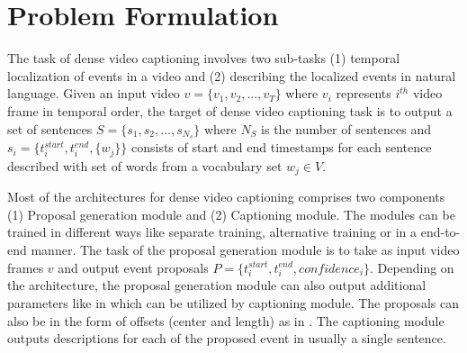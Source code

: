\section{Problem Formulation}
\par The task of dense video captioning involves two sub-tasks (1) temporal localization of events in a video and (2) describing the localized events in natural language. Given an input video $v = \{v_1, v_2, ... , v_T \}$ where $v_i$ represents $i^{th}$ video frame in temporal order, the target of dense video captioning task is to output a set of sentences $S = \{s_1, s_2, ... , s_{N_s}\}$ where $N_S$ is the number of sentences and $s_i = \{t_i^{start}, t_i^{end}, \{w_j\} \}$ consists of start and end timestamps for each sentence described with set of words from a vocabulary set $w_j \in V$.
\par Most of the architectures for dense video captioning comprises two components (1) Proposal generation module and (2) Captioning module. The modules can be trained in different ways like separate training, alternative training or in a end-to-end manner. The task of the proposal generation module is to take as input video frames $v$ and output event proposals $P = \{t_i^{start}, t_i^{end}, confidence_i \}$. Depending on the architecture, the proposal generation module can also output additional parameters like in \cite{krishna2017densecaptioning, li2018jointly, wang2018bidirectional} which can be utilized by captioning module. The proposals can also be in the form of offsets (center and length) as in \cite{li2018jointly, iashin2020better, xu2018joint, deng2021sketch, zhou2018end}. The captioning module outputs descriptions for each of the proposed event in usually a single sentence.
